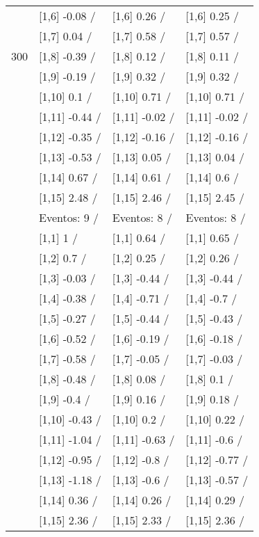 \begin{table}
\begin{tabular}[t]{llll}
 & {}[1,6] -0.08  / & {}[1,6] 0.26  / & {}[1,6] 0.25  /\\
 & {}[1,7] 0.04  / & {}[1,7] 0.58  / & {}[1,7] 0.57  /\\
300 & {}[1,8] -0.39  / & {}[1,8] 0.12  / & {}[1,8] 0.11  /\\
\addlinespace
 & {}[1,9] -0.19  / & {}[1,9] 0.32  / & {}[1,9] 0.32  /\\
 & {}[1,10] 0.1  / & {}[1,10] 0.71  / & {}[1,10] 0.71  /\\
 & {}[1,11] -0.44  / & {}[1,11] -0.02  / & {}[1,11] -0.02  /\\
 & {}[1,12] -0.35  / & {}[1,12] -0.16  / & {}[1,12] -0.16  /\\
 & {}[1,13] -0.53  / & {}[1,13] 0.05  / & {}[1,13] 0.04  /\\
\addlinespace
 & {}[1,14] 0.67  / & {}[1,14] 0.61  / & {}[1,14] 0.6  /\\
 & {}[1,15] 2.48  / & {}[1,15] 2.46  / & {}[1,15] 2.45  /\\
 & Eventos:  9 / & Eventos:  8 / & Eventos:  8 /\\
 & {}[1,1] 1  / & {}[1,1] 0.64  / & {}[1,1] 0.65  /\\
 & {}[1,2] 0.7  / & {}[1,2] 0.25  / & {}[1,2] 0.26  /\\
\addlinespace
 & {}[1,3] -0.03  / & {}[1,3] -0.44  / & {}[1,3] -0.44  /\\
 & {}[1,4] -0.38  / & {}[1,4] -0.71  / & {}[1,4] -0.7  /\\
 & {}[1,5] -0.27  / & {}[1,5] -0.44  / & {}[1,5] -0.43  /\\
 & {}[1,6] -0.52  / & {}[1,6] -0.19  / & {}[1,6] -0.18  /\\
 & {}[1,7] -0.58  / & {}[1,7] -0.05  / & {}[1,7] -0.03  /\\
\addlinespace
500 & {}[1,8] -0.48  / & {}[1,8] 0.08  / & {}[1,8] 0.1  /\\
 & {}[1,9] -0.4  / & {}[1,9] 0.16  / & {}[1,9] 0.18  /\\
 & {}[1,10] -0.43  / & {}[1,10] 0.2  / & {}[1,10] 0.22  /\\
 & {}[1,11] -1.04  / & {}[1,11] -0.63  / & {}[1,11] -0.6  /\\
 & {}[1,12] -0.95  / & {}[1,12] -0.8  / & {}[1,12] -0.77  /\\
\addlinespace
 & {}[1,13] -1.18  / & {}[1,13] -0.6  / & {}[1,13] -0.57  /\\
 & {}[1,14] 0.36  / & {}[1,14] 0.26  / & {}[1,14] 0.29  /\\
 & {}[1,15] 2.36  / & {}[1,15] 2.33  / & {}[1,15] 2.36  /\\
\bottomrule
\end{tabular}
\end{table}

